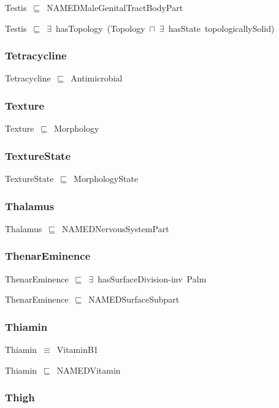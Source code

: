 \documentclass{article}
\begin{document}
Testis~\ensuremath{\sqsubseteq}~NAMEDMaleGenitalTractBodyPart~

Testis~\ensuremath{\sqsubseteq}~\ensuremath{\exists}~hasTopology~(Topology~\ensuremath{\sqcap}~\ensuremath{\exists}~hasState~topologicallySolid)~

\subsubsection*{Tetracycline}

Tetracycline~\ensuremath{\sqsubseteq}~Antimicrobial~

\subsubsection*{Texture}

Texture~\ensuremath{\sqsubseteq}~Morphology~

\subsubsection*{TextureState}

TextureState~\ensuremath{\sqsubseteq}~MorphologyState~

\subsubsection*{Thalamus}

Thalamus~\ensuremath{\sqsubseteq}~NAMEDNervousSystemPart~

\subsubsection*{ThenarEminence}

ThenarEminence~\ensuremath{\sqsubseteq}~\ensuremath{\exists}~hasSurfaceDivision-inv~Palm~

ThenarEminence~\ensuremath{\sqsubseteq}~NAMEDSurfaceSubpart~

\subsubsection*{Thiamin}

Thiamin~\ensuremath{\equiv}~VitaminB1

Thiamin~\ensuremath{\sqsubseteq}~NAMEDVitamin~

\subsubsection*{Thigh}
\end{document}
